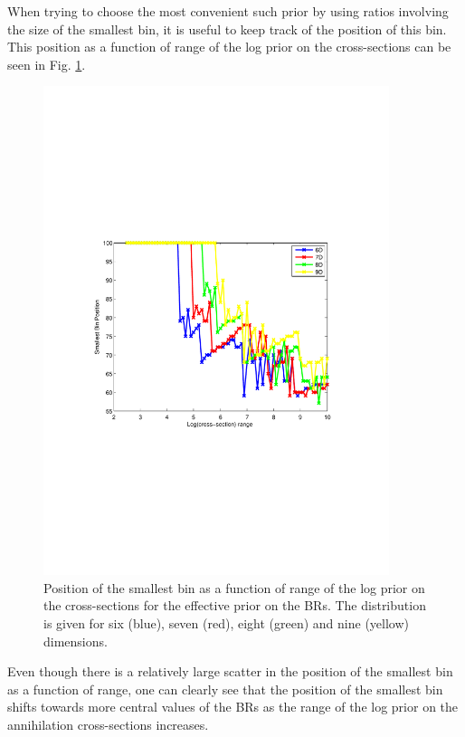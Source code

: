 \documentclass{article}
\begin{document}
When trying to choose the most convenient such prior by using ratios involving the size of the smallest bin, it is useful to keep track of the position of this bin. This position as a function of range of the log prior on the cross-sections can be seen in Fig. \ref{Minbin Position}.
\begin{figure}
\centering
\includegraphics[trim = 70 240 90 240, clip = true, width=0.9\textwidth]{figs/Min_bin_vs_Range}
\caption{Position of the smallest bin as a function of range of the log prior on the cross-sections for the effective prior on the BRs. The distribution is given for six (blue), seven (red), eight (green) and nine (yellow) dimensions.}
\label{Minbin Position}
\end{figure}
Even though there is a relatively large scatter in the position of the smallest bin as a function of range, one can clearly see that the position of the smallest bin shifts towards more central values of the BRs as the range of the log prior on the annihilation cross-sections increases.
\end{document}
